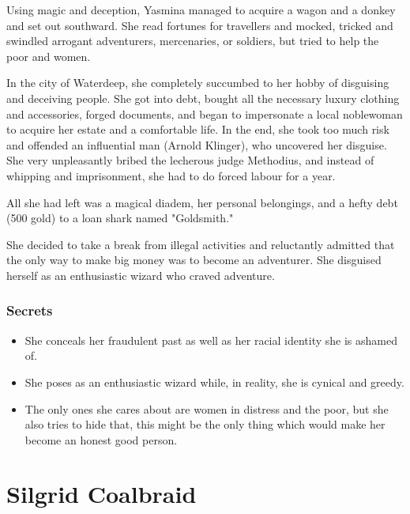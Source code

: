\documentclass[10pt,onecolumn,twoside,openany,bg=full,layout=true]{dndbook}
\begin{document}
Using magic and deception, Yasmina managed to acquire a wagon and a donkey and set out southward.
She read fortunes for travellers and mocked, tricked and swindled arrogant adventurers, mercenaries, or soldiers,
but tried to help the poor and women.

In the city of Waterdeep, she completely succumbed to her hobby of disguising and deceiving people.
She got into debt, bought all the necessary luxury clothing and accessories, forged documents, and began to impersonate
a local noblewoman to acquire her estate and a comfortable life.
In the end, she took too much risk and offended an influential man (Arnold Klinger), who uncovered her disguise.
She very unpleasantly bribed the lecherous judge Methodius, and instead of whipping and imprisonment,
she had to do forced labour for a year.

All she had left was a magical diadem, her personal belongings, and a hefty debt (500 gold) to a loan shark named "Goldsmith."

She decided to take a break from illegal activities and reluctantly admitted that the only way to make big money was
to become an adventurer.
She disguised herself as an enthusiastic wizard who craved adventure.

\subsubsection{Secrets}\label{subsec:yasmina-secrets}
\begin{itemize}
\item She conceals her fraudulent past as well as her racial identity she is ashamed of.
\item She poses as an enthusiastic wizard while, in reality, she is cynical and greedy.
\item The only ones she cares about are women in distress and the poor, but she also tries to hide that,
this might be the only thing which would make her become an honest good person.
\end{itemize}

\vfill
\pagebreak

\section{Silgrid Coalbraid}\label{sec:silgrid-coalbraid}
\end{document}
